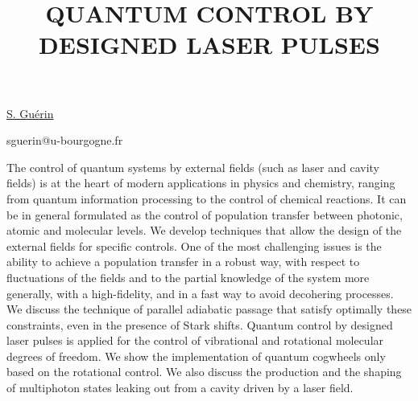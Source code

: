 \title{QUANTUM CONTROL BY DESIGNED LASER PULSES}

\underline{S. Gu\'erin} 

{\normalsize{\vspace{-4mm}
\dijon

\email sguerin@u-bourgogne.fr}}

The control of quantum systems by external fields (such as laser and cavity fields) is at the heart of modern applications in physics and chemistry, ranging from quantum information processing to the control of chemical reactions.
It can be in general formulated as the control of population transfer between photonic, atomic and molecular levels.
We develop techniques that allow the design of the external fields for specific controls. One of the most challenging issues is the ability to achieve a population transfer in a robust way, with respect to fluctuations of the fields and to the partial knowledge of the system more generally, with a high-fidelity, and in a fast way to avoid decohering processes. We discuss the technique of parallel adiabatic passage that satisfy optimally these constraints, even in the presence of Stark shifts.
Quantum control by designed laser pulses is applied for the control of vibrational and rotational molecular degrees of freedom. We show the implementation of quantum cogwheels only based on the rotational control.
We also discuss the production and the shaping of multiphoton states leaking out from a cavity driven by a laser field.

\vspace{\baselineskip} 